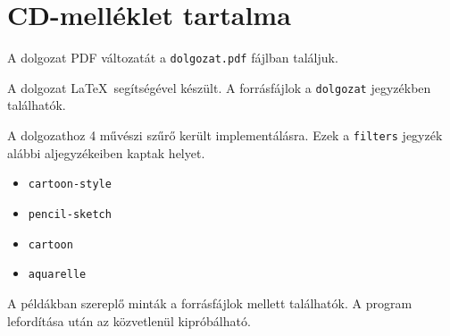 \newpage
\section*{CD-melléklet tartalma}

A dolgozat PDF változatát a \texttt{dolgozat.pdf} fájlban találjuk.

A dolgozat \LaTeX\ segítségével készült. A forrásfájlok a \texttt{dolgozat} jegyzékben találhatók.

A dolgozathoz 4 művészi szűrő került implementálásra. Ezek a \texttt{filters} jegyzék alábbi aljegyzékeiben kaptak helyet.
\begin{itemize}
\item \texttt{cartoon-style}
\item \texttt{pencil-sketch}
\item \texttt{cartoon}
\item \texttt{aquarelle}
\end{itemize}

A példákban szereplő minták a forrásfájlok mellett találhatók. A program lefordítása után az közvetlenül kipróbálható.
